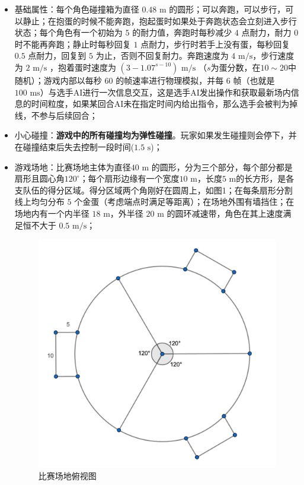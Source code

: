 \documentclass[UTF8]{article}
\begin{document}
\begin{itemize}
\item
  基础属性：每个角色碰撞箱为直径 \(0.48 \text{ m}\)
  的圆形；可以奔跑，可以步行，可以静止；在抱蛋的时候不能奔跑，抱起蛋时如果处于奔跑状态会立刻进入步行状态；每个角色有一个初始为
  \(5\) 的耐力值，奔跑时每秒减少 \(4\) 点耐力，耐力 \( 0 \)
  时不能再奔跑；静止时每秒回复 \(1\)
  点耐力，步行时若手上没有蛋，每秒回复 \( 0.5 \) 点耐力，回复到 \(5 \)
  为止，否则不回复耐力。奔跑速度为 \(4\text{ m/s}\)，步行速度为
  \(2\text{ m/s}\) ，抱着蛋时速度为 \((3-1.07^{s-10})\text{ m/s}\)
  （\(s\)为蛋分数，在\(10\sim20\)中随机）；游戏内部以每秒 \(60\)
  的帧速率进行物理模拟，并每 \(6\) 帧（也就是
  \(100\text{ ms}\)）与选手AI进行一次信息交互，这是选手AI发出操作和获取最新场内信息的时间粒度，如果某回合AI未在指定时间内给出指令，那么选手会被判为掉线，不参与后续回合；
\item
  小心碰撞：\textbf{游戏中的所有碰撞均为弹性碰撞}。玩家如果发生碰撞则会停下，并在碰撞结束后失去控制一段时间(\(1.5\text{ s}\))；
\item
  游戏场地：比赛场地主体为直径\( 40\text{ m}\)
  的圆形，分为三个部分，每个部分都是扇形且圆心角\(120^\circ\)；每个扇形边缘有一个宽度\( 10\text{ m}\)，长度\( 5\text{ m} \)的长方形，是各支队伍的得分区域。得分区域两个角刚好在圆周上，如图1；在每条扇形分割线上均匀分布
  \(5\)
  个金蛋（考虑端点时满足等距离）；在场地外围有墙挡住；在场地内有一个内半径
  \(18\text{ m}\)，外半径 \(20\text{ m}\)
  的圆环减速带，角色在其上速度满足恒不大于 \(0.5\text{ m/s}\)；
  \begin{figure}[ht]

    \centering
    \includegraphics[scale=0.15]{ground.png}
    \caption{比赛场地俯视图}
    \end{figure}
\end{itemize}
\end{document}
